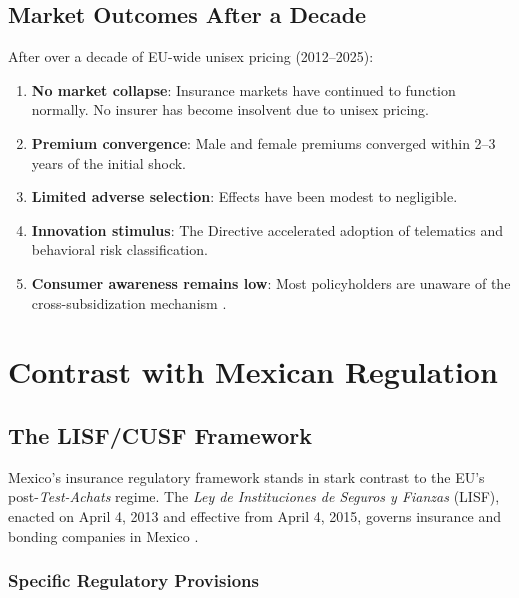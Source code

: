 \documentclass[12pt,a4paper]{article}
\begin{document}
\subsection{Market Outcomes After a Decade}
\label{subsec:decade-evidence}

After over a decade of EU-wide unisex pricing (2012--2025):

\begin{enumerate}
  \item \textbf{No market collapse}: Insurance markets have continued to function normally. No insurer has become insolvent due to unisex pricing.
  \item \textbf{Premium convergence}: Male and female premiums converged within 2--3 years of the initial shock.
  \item \textbf{Limited adverse selection}: Effects have been modest to negligible.
  \item \textbf{Innovation stimulus}: The Directive accelerated adoption of telematics and behavioral risk classification.
  \item \textbf{Consumer awareness remains low}: Most policyholders are unaware of the cross-subsidization mechanism \cite{schmeiser2014}.
\end{enumerate}


\section{Contrast with Mexican Regulation}
\label{sec:mexico}

\subsection{The LISF/CUSF Framework}
\label{subsec:lisf}

Mexico's insurance regulatory framework stands in stark contrast to the EU's post-\emph{Test-Achats} regime. The \emph{Ley de Instituciones de Seguros y Fianzas} (LISF), enacted on April 4, 2013 and effective from April 4, 2015, governs insurance and bonding companies in Mexico \cite{lisf2013}.

\subsubsection{Specific Regulatory Provisions}
\end{document}
